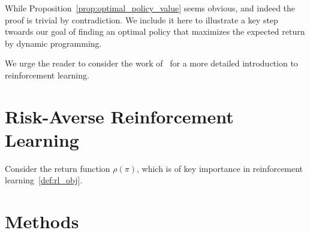 \documentclass[10pt]{article}
\renewcommand{\cite}{\citep}
\theoremstyle{plain}
\theoremstyle{remark}
\begin{document}
While Proposition~\ref{prop:optimal_policy_value} seems obvious, and indeed the proof is trivial by contradiction. We include it here to illustrate a key step twoards our goal of finding an optimal policy that maximizes the expected return by dynamic programming.

We urge the reader to consider the work of~\cite{sutton2018} for a more detailed introduction to reinforcement learning.

\section{Risk-Averse Reinforcement Learning}

Consider the return function $\rho(\pi)$, which is of key importance in reinforcement learning~\ref{def:rl_obj}.

\section{Methods}


\end{document}
